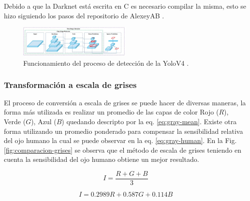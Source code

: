 Debido a que la Darknet está escrita en C es necesario compilar la misma, esto se hizo siguiendo los pasos del repositorio de AlexeyAB \cite{alexey_yolo_2023}.


\begin{figure}
    \centering
    \includegraphics[width=0.5\textwidth]{imgs/funcionamiento-yolo.png}
    \caption{Funcionamiento del proceso de detección de la YoloV4 \cite{bochkovskiy_yolov4_2020}.}
    \label{fig:funcionamiento-yolo}
\end{figure}

\subsubsection*{Transformación a escala de grises}

El proceso de conversión a escala de grises se puede hacer de diversas maneras, la forma más utilizada es realizar un promedio de las capas de color Rojo ($R$), Verde ($G$), Azul ($B$) quedando descripto por la eq. \ref{eq:gray-mean}. Existe otra forma utilizando un promedio ponderado para compensar la sensibilidad relativa del ojo humano la cual se puede observar en la eq. \ref{eq:gray-human}. En la Fig. \ref{fig:comparacion-grises} se observa que el método de escala de grises teniendo en cuenta la sensibilidad del ojo humano obtiene un mejor resultado.

\begin{equation}
    \label{eq:gray-mean}
    I = \frac{R + G + B}{3}
\end{equation}

\begin{equation}
    \label{eq:gray-human}
    I = 0.2989R + 0.587G + 0.114B
\end{equation}

